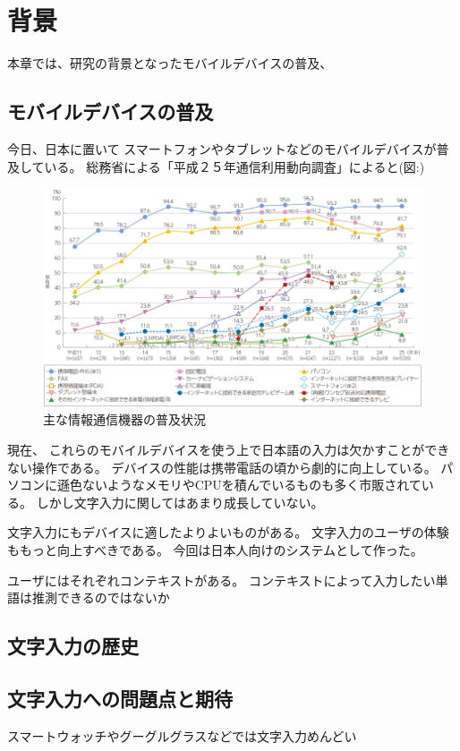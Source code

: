 \chapter{背景}
\label{chap:background}

本章では、研究の背景となったモバイルデバイスの普及、

\newpage
\section{モバイルデバイスの普及}

今日、日本に置いて
スマートフォンやタブレットなどのモバイルデバイスが普及している。
\cite{mobiledevicespread}
総務省による「平成２５年通信利用動向調査」によると(図:)
\begin{figure}
  \begin{center}
    \includegraphics[width=14cm,bb=0 0 856 494]{images/mobiledevicespread.png}
    \caption{主な情報通信機器の普及状況\cite[出典]{communicationreport}}
    \label{mobiledevicespread}
  \end{center}
\end{figure}

現在、
これらのモバイルデバイスを使う上で日本語の入力は欠かすことができない操作である。
デバイスの性能は携帯電話の頃から劇的に向上している。
パソコンに遜色ないようなメモリやCPUを積んでいるものも多く市販されている。
しかし文字入力に関してはあまり成長していない。

文字入力にもデバイスに適したよりよいものがある。
文字入力のユーザの体験ももっと向上すべきである。
今回は日本人向けのシステムとして作った。

ユーザにはそれぞれコンテキストがある。
コンテキストによって入力したい単語は推測できるのではないか

\section{文字入力の歴史}

\section{文字入力への問題点と期待}

スマートウォッチやグーグルグラスなどでは文字入力めんどい
